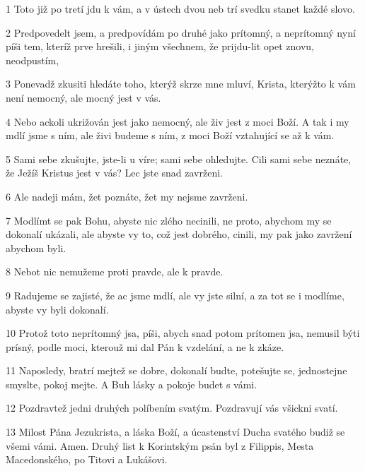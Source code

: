 \par 1 Toto již po tretí jdu k vám, a v ústech dvou neb trí svedku stanet každé slovo.
\par 2 Predpovedelt jsem, a predpovídám po druhé jako prítomný, a neprítomný nyní píši tem, kteríž prve hrešili, i jiným všechnem, že prijdu-lit opet znovu, neodpustím,
\par 3 Ponevadž zkusiti hledáte toho, kterýž skrze mne mluví, Krista, kterýžto k vám není nemocný, ale mocný jest v vás.
\par 4 Nebo ackoli ukrižován jest jako nemocný, ale živ jest z moci Boží. A tak i my mdlí jsme s ním, ale živi budeme s ním, z moci Boží vztahující se až k vám.
\par 5 Sami sebe zkušujte, jste-li u víre; sami sebe ohledujte. Cili sami sebe neznáte, že Ježíš Kristus jest v vás? Lec jste snad zavrženi.
\par 6 Ale nadeji mám, žet poznáte, žet my nejsme zavrženi.
\par 7 Modlímt se pak Bohu, abyste nic zlého necinili, ne proto, abychom my se dokonalí ukázali, ale abyste vy to, což jest dobrého, cinili, my pak jako zavržení abychom byli.
\par 8 Nebot nic nemužeme proti pravde, ale k pravde.
\par 9 Radujeme se zajisté, že ac jsme mdlí, ale vy jste silní, a za tot se i modlíme, abyste vy byli dokonalí.
\par 10 Protož toto neprítomný jsa, píši, abych snad potom prítomen jsa, nemusil býti prísný, podle moci, kterouž mi dal Pán k vzdelání, a ne k zkáze.
\par 11 Naposledy, bratrí mejtež se dobre, dokonalí budte, potešujte se, jednostejne smyslte, pokoj mejte. A Buh lásky a pokoje budet s vámi.
\par 12 Pozdravtež jedni druhých políbením svatým. Pozdravují vás všickni svatí.
\par 13 Milost Pána Jezukrista, a láska Boží, a úcastenství Ducha svatého budiž se všemi vámi. Amen. Druhý list k Korintským psán byl z Filippis, Mesta Macedonského, po Titovi a Lukášovi.


